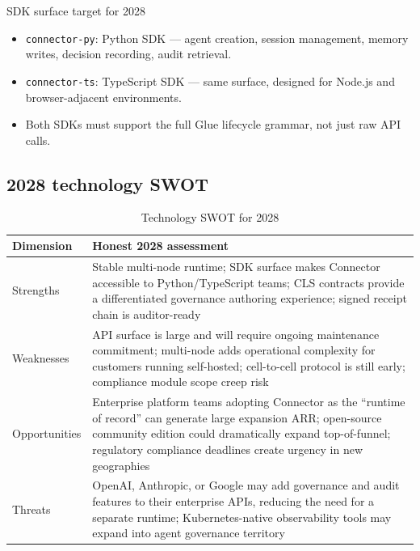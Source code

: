 \begin{defbox}{SDK surface target for 2028}
\begin{itemize}[noitemsep,leftmargin=1.4em]
  \item \texttt{connector-py}: Python SDK — agent creation, session management,
        memory writes, decision recording, audit retrieval.
  \item \texttt{connector-ts}: TypeScript SDK — same surface, designed for
        Node.js and browser-adjacent environments.
  \item Both SDKs must support the full Glue lifecycle grammar, not just raw
        API calls.
\end{itemize}
\end{defbox}

\subsection{2028 technology SWOT}

\begin{table}[H]
\centering
\renewcommand{\arraystretch}{1.45}
\begin{tabularx}{\textwidth}{@{}lX@{}}
\toprule
\textbf{Dimension} & \textbf{Honest 2028 assessment} \\
\midrule
Strengths & Stable multi-node runtime; SDK surface makes Connector accessible to Python/TypeScript teams; CLS contracts provide a differentiated governance authoring experience; signed receipt chain is auditor-ready \\
Weaknesses & API surface is large and will require ongoing maintenance commitment; multi-node adds operational complexity for customers running self-hosted; cell-to-cell protocol is still early; compliance module scope creep risk \\
Opportunities & Enterprise platform teams adopting Connector as the ``runtime of record'' can generate large expansion ARR; open-source community edition could dramatically expand top-of-funnel; regulatory compliance deadlines create urgency in new geographies \\
Threats & OpenAI, Anthropic, or Google may add governance and audit features to their enterprise APIs, reducing the need for a separate runtime; Kubernetes-native observability tools may expand into agent governance territory \\
\bottomrule
\end{tabularx}
\caption{Technology SWOT for 2028}
\end{table}

